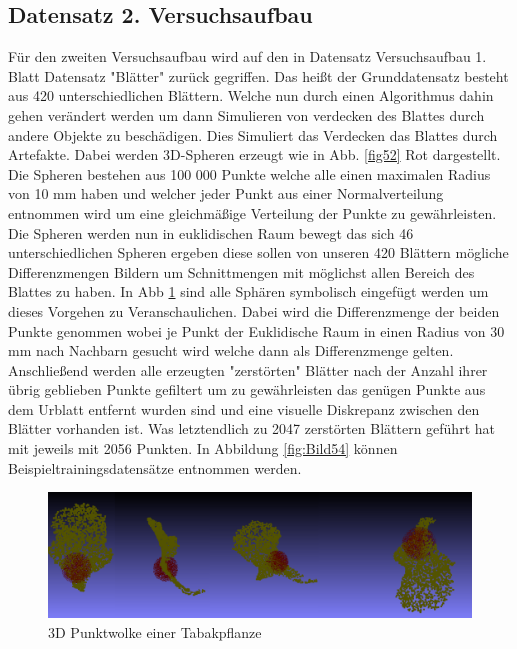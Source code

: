 \documentclass{llncs}
\begin{document}
\subsection{Datensatz 2. Versuchsaufbau}\label{sec:versuch2_daten}

Für den zweiten Versuchsaufbau wird auf den in Datensatz Versuchsaufbau 1. Blatt Datensatz "Blätter" zurück gegriffen. Das heißt der Grunddatensatz besteht aus 420 unterschiedlichen Blättern. Welche nun durch einen Algorithmus dahin gehen verändert werden um dann Simulieren von verdecken des Blattes durch andere Objekte zu beschädigen. Dies Simuliert das Verdecken das Blattes durch Artefakte. Dabei werden 3D-Spheren erzeugt wie in Abb. \ref{fig52} Rot dargestellt. Die Spheren bestehen aus 100 000 Punkte welche alle einen maximalen Radius von 10 mm haben und welcher jeder Punkt aus einer Normalverteilung entnommen wird um  eine gleichmäßige Verteilung der Punkte zu gewährleisten. Die Spheren werden nun in euklidischen Raum bewegt das sich 46 unterschiedlichen Spheren ergeben diese sollen von unseren 420 Blättern mögliche Differenzmengen Bildern um Schnittmengen mit möglichst allen Bereich des Blattes zu haben. In Abb  \ref{fig:Bild52} sind alle Sphären symbolisch eingefügt werden um dieses Vorgehen zu Veranschaulichen. Dabei wird die Differenzmenge der beiden Punkte genommen wobei je Punkt der Euklidische Raum in einen Radius von 30 mm nach Nachbarn gesucht wird welche dann als Differenzmenge gelten. Anschließend werden alle erzeugten "zerstörten" Blätter nach der Anzahl ihrer übrig geblieben Punkte gefiltert um zu gewährleisten das genügen Punkte aus dem Urblatt entfernt wurden sind und eine visuelle Diskrepanz zwischen den Blätter vorhanden ist. Was letztendlich zu 2047 zerstörten Blättern geführt hat mit jeweils mit 2056 Punkten. In Abbildung \ref{fig:Bild54} können Beispieltrainingsdatensätze entnommen werden.

\begin{figure}[htbp] 
	\centering
	\includegraphics[width=1.0\textwidth]{sphere1.png}
	\caption{3D Punktwolke einer Tabakpflanze}
	\label{fig:Bild52}
\end{figure}
\end{document}
